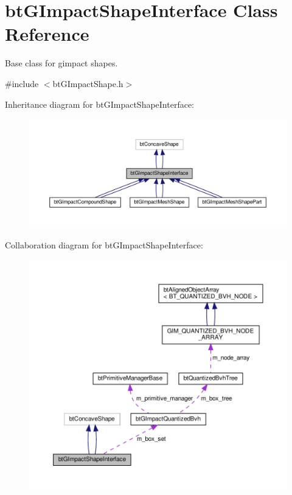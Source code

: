 \hypertarget{classbtGImpactShapeInterface}{}\section{bt\+G\+Impact\+Shape\+Interface Class Reference}
\label{classbtGImpactShapeInterface}


Base class for gimpact shapes.  




{\ttfamily \#include $<$bt\+G\+Impact\+Shape.\+h$>$}



Inheritance diagram for bt\+G\+Impact\+Shape\+Interface\+:
\nopagebreak
\begin{figure}[H]
\begin{center}
\leavevmode
\includegraphics[width=350pt]{classbtGImpactShapeInterface__inherit__graph}
\end{center}
\end{figure}


Collaboration diagram for bt\+G\+Impact\+Shape\+Interface\+:
\nopagebreak
\begin{figure}[H]
\begin{center}
\leavevmode
\includegraphics[width=350pt]{classbtGImpactShapeInterface__coll__graph}
\end{center}
\end{figure}
